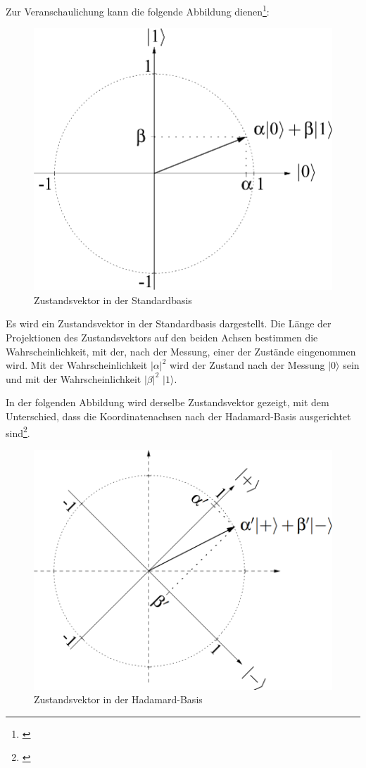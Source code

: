 Zur Veranschaulichung kann die folgende Abbildung dienen\footnote{\cite[S. 44]{homeister_quantum_2022}}: \\


\begin{figure}[!h]
    \centering
    \includegraphics[width=0.5\linewidth]{img/Zustandsvektor_Standardbasis.png}
    \caption{Zustandsvektor in der Standardbasis}
    \label{fig:Standardbasis}
\end{figure}

Es wird ein Zustandsvektor in der Standardbasis dargestellt. Die Länge der Projektionen des Zustandsvektors auf den beiden Achsen bestimmen die Wahrscheinlichkeit, mit der, nach der Messung, einer der Zustände eingenommen wird. Mit der Wahrscheinlichkeit $\left|\alpha\right|^2$ wird der Zustand nach der Messung $\left|0\right.\rangle$ sein und mit der Wahrscheinlichkeit $\left|\beta\right|^2$ $\left|1\right.\rangle$. 

In der folgenden Abbildung wird derselbe Zustandsvektor gezeigt, mit dem Unterschied, dass die Koordinatenachsen nach der Hadamard-Basis ausgerichtet sind\footnote{\cite[S. 45]{homeister_quantum_2022}}.

\begin{figure}[h]
    \centering
    \includegraphics[width=0.5\linewidth]{img/Zustandsvektor_Hadamard-Basis.png}
    \caption{Zustandsvektor in der Hadamard-Basis}
    \label{fig:Hadamardbasis}
\end{figure}

